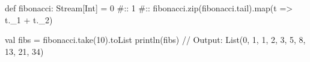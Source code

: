 def fibonacci: Stream[Int] = 0 #:: 1 #:: fibonacci.zip(fibonacci.tail).map(t => t._1 + t._2)

val fibs = fibonacci.take(10).toList
println(fibs) // Output: List(0, 1, 1, 2, 3, 5, 8, 13, 21, 34)